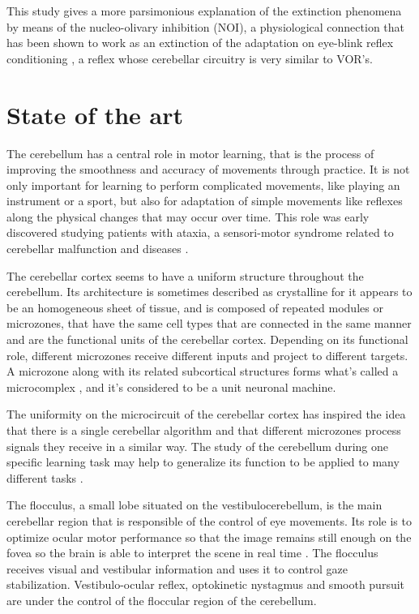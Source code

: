 \documentclass[12pt, a4paper,twoside]{tesi_upf}
\begin{document}
This study gives a more parsimonious explanation of the extinction phenomena by means of the nucleo-olivary inhibition (NOI), a physiological connection that has been shown to work as an extinction of the adaptation on eye-blink reflex conditioning  \cite{Emken2007, Herreros2013b}, a reflex whose cerebellar circuitry is very similar to VOR's.

\section{State of the art}

The cerebellum has a central role in motor learning, that is the process of improving the smoothness and accuracy of movements through practice. It is not only important for learning to perform complicated movements, like playing an instrument or a sport, but also for adaptation of simple movements like reflexes along the physical changes that may occur over time. This role was early discovered studying patients with ataxia, a sensori-motor syndrome related to cerebellar malfunction and diseases \cite{Mapelli2015}.

The cerebellar cortex seems to have a uniform structure throughout the cerebellum. Its architecture is sometimes described as crystalline for it appears to be an homogeneous sheet of tissue, and is composed of repeated modules or microzones, that have the same cell types that are connected in the same manner and are the functional units of the cerebellar cortex. Depending on its functional role, different microzones receive different inputs and project to different targets. A microzone along with its related subcortical structures forms what's called a microcomplex \cite{Ito1982}, and it's considered to be a unit neuronal machine.

The uniformity on the microcircuit of the cerebellar cortex has inspired the idea that there is a single cerebellar algorithm and that different microzones process signals they receive in a similar way. The study of the cerebellum during one specific learning task may help to generalize its function to be applied to many different tasks \cite{Boyden2004}.

The flocculus, a small lobe situated on the vestibulocerebellum, is the main cerebellar region that is responsible of the control of eye movements. Its role is to optimize ocular motor performance so that the image remains still enough on the fovea so the brain is able to interpret the scene in real time \cite{Kheradmand2011}. The flocculus receives visual and vestibular information and uses it to control gaze stabilization. Vestibulo-ocular reflex, optokinetic nystagmus and smooth pursuit are under the control of the floccular region of the cerebellum.
\end{document}
